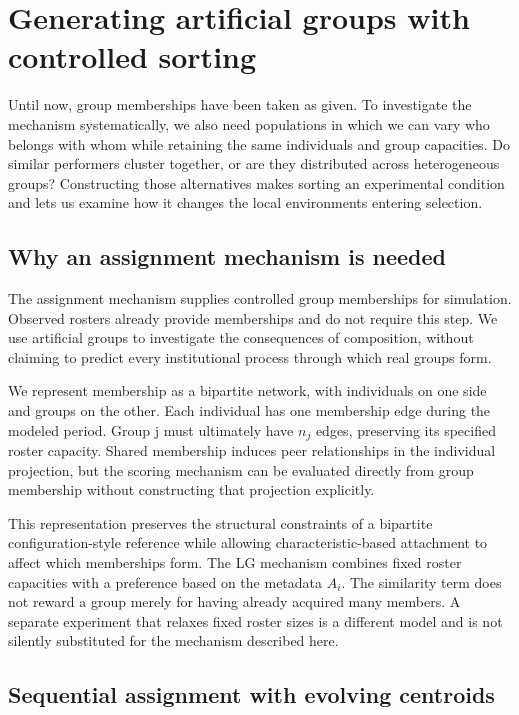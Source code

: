 \section{Generating artificial groups with controlled sorting}\label{generating-artificial-groups-with-controlled-sorting}

Until now, group memberships have been taken as given. To investigate the mechanism systematically, we also need populations in which we can vary who belongs with whom while retaining the same individuals and group capacities. Do similar performers cluster together, or are they distributed across heterogeneous groups? Constructing those alternatives makes sorting an experimental condition and lets us examine how it changes the local environments entering selection.

\subsection{Why an assignment mechanism is needed}\label{why-an-assignment-mechanism-is-needed}

The assignment mechanism supplies controlled group memberships for simulation. Observed rosters already provide memberships and do not require this step. We use artificial groups to investigate the consequences of composition, without claiming to predict every institutional process through which real groups form.

We represent membership as a bipartite network, with individuals on one side and groups on the other. Each individual has one membership edge during the modeled period. Group j must ultimately have \(n_{j}\) edges, preserving its specified roster capacity. Shared membership induces peer relationships in the individual projection, but the scoring mechanism can be evaluated directly from group membership without constructing that projection explicitly.

This representation preserves the structural constraints of a bipartite configuration-style reference while allowing characteristic-based attachment to affect which memberships form. The LG mechanism combines fixed roster capacities with a preference based on the metadata \(A_{i}\). The similarity term does not reward a group merely for having already acquired many members. A separate experiment that relaxes fixed roster sizes is a different model and is not silently substituted for the mechanism described here.

\subsection{Sequential assignment with evolving centroids}\label{sequential-assignment-with-evolving-centroids}

